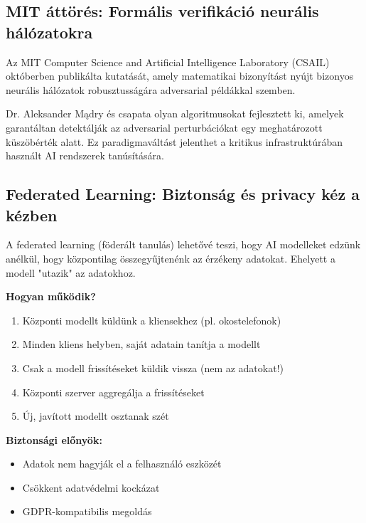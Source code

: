 \documentclass{../templates/magazine}
\begin{document}
\subsection{MIT áttörés: Formális verifikáció neurális hálózatokra}

Az MIT Computer Science and Artificial Intelligence Laboratory (CSAIL) októberben publikálta kutatását, amely matematikai bizonyítást nyújt bizonyos neurális hálózatok robusztusságára adversarial példákkal szemben.

\begin{tipbox}
Dr. Aleksander Mądry és csapata olyan algoritmusokat fejlesztett ki, amelyek garantáltan detektálják az adversarial perturbációkat egy meghatározott küszöbérték alatt. Ez paradigmaváltást jelenthet a kritikus infrastruktúrában használt AI rendszerek tanúsítására.
\end{tipbox}

\subsection{Federated Learning: Biztonság és privacy kéz a kézben}

A federated learning (föderált tanulás) lehetővé teszi, hogy AI modelleket edzünk anélkül, hogy központilag összegyűjtenénk az érzékeny adatokat. Ehelyett a modell "utazik" az adatokhoz.

\textbf{Hogyan működik?}

\begin{enumerate}
    \item Központi modellt küldünk a kliensekhez (pl. okostelefonok)
    \item Minden kliens helyben, saját adatain tanítja a modellt
    \item Csak a modell frissítéseket küldik vissza (nem az adatokat!)
    \item Központi szerver aggregálja a frissítéseket
    \item Új, javított modellt osztanak szét
\end{enumerate}

\textbf{Biztonsági előnyök:}
\begin{itemize}
    \item Adatok nem hagyják el a felhasználó eszközét
    \item Csökkent adatvédelmi kockázat
    \item GDPR-kompatibilis megoldás
\end{itemize}
\end{document}
